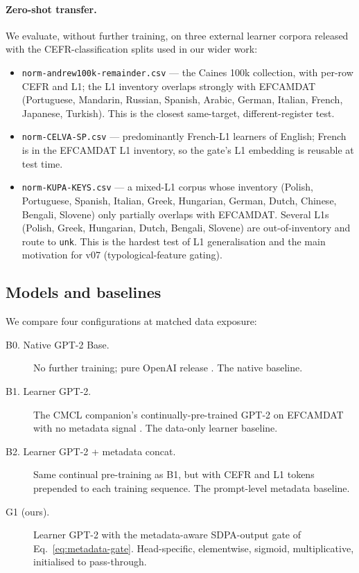 \paragraph{Zero-shot transfer.}
We evaluate, without further training, on three external learner
corpora released with the CEFR-classification splits used in our wider
work:
\begin{itemize}
  \item \texttt{norm-andrew100k-remainder.csv} --- the Caines 100k
    collection, with per-row CEFR and L1; the L1 inventory overlaps
    strongly with EFCAMDAT (Portuguese, Mandarin, Russian, Spanish,
    Arabic, German, Italian, French, Japanese, Turkish). This is the
    closest same-target, different-register test.
  \item \texttt{norm-CELVA-SP.csv} --- predominantly French-L1 learners
    of English; French is in the EFCAMDAT L1 inventory, so the gate's
    L1 embedding is reusable at test time.
  \item \texttt{norm-KUPA-KEYS.csv} --- a mixed-L1 corpus whose
    inventory (Polish, Portuguese, Spanish, Italian, Greek, Hungarian,
    German, Dutch, Chinese, Bengali, Slovene) only partially overlaps
    with EFCAMDAT. Several L1s (Polish, Greek, Hungarian, Dutch,
    Bengali, Slovene) are out-of-inventory and route to \texttt{unk}.
    This is the hardest test of L1 generalisation and the main
    motivation for v07 (typological-feature gating).
\end{itemize}

\subsection{Models and baselines}
\label{subsec:models}

We compare four configurations at matched data exposure:
\begin{description}
  \item[B0. Native GPT-2 Base.] No further training; pure OpenAI
    release \citep{radford2019gpt2}. The native baseline.
  \item[B1. Learner GPT-2.] The CMCL companion's continually-pre-trained
    GPT-2 on EFCAMDAT with no metadata signal
    \citep{stearns2026artificial}. The data-only learner baseline.
  \item[B2. Learner GPT-2 + metadata concat.] Same continual
    pre-training as B1, but with CEFR and L1 tokens prepended to each
    training sequence. The prompt-level metadata baseline.
  \item[G1 (ours).] Learner GPT-2 with the metadata-aware SDPA-output
    gate of Eq.~\eqref{eq:metadata-gate}. Head-specific, elementwise,
    sigmoid, multiplicative, initialised to pass-through.
\end{description}

